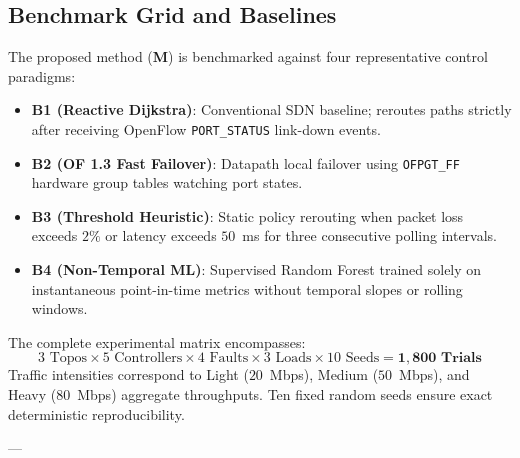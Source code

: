 \documentclass[journal,10pt,twocolumn]{IEEEtran}
\begin{document}
\subsection{Benchmark Grid and Baselines}
The proposed method (\textbf{M}) is benchmarked against four representative control paradigms:
\begin{itemize}
    \item \textbf{B1 (Reactive Dijkstra)}: Conventional SDN baseline; reroutes paths strictly after receiving OpenFlow \texttt{PORT\_STATUS} link-down events.
    \item \textbf{B2 (OF 1.3 Fast Failover)}: Datapath local failover using \texttt{OFPGT\_FF} hardware group tables watching port states.
    \item \textbf{B3 (Threshold Heuristic)}: Static policy rerouting when packet loss exceeds $2\%$ or latency exceeds $50$~ms for three consecutive polling intervals.
    \item \textbf{B4 (Non-Temporal ML)}: Supervised Random Forest trained solely on instantaneous point-in-time metrics without temporal slopes or rolling windows.
\end{itemize}

The complete experimental matrix encompasses:
$$\text{3 Topos} \times \text{5 Controllers} \times \text{4 Faults} \times \text{3 Loads} \times \text{10 Seeds} = \mathbf{1{,}800 \text{ Trials}}$$
Traffic intensities correspond to Light ($20$~Mbps), Medium ($50$~Mbps), and Heavy ($80$~Mbps) aggregate throughputs. Ten fixed random seeds ensure exact deterministic reproducibility.

---
\end{document}
